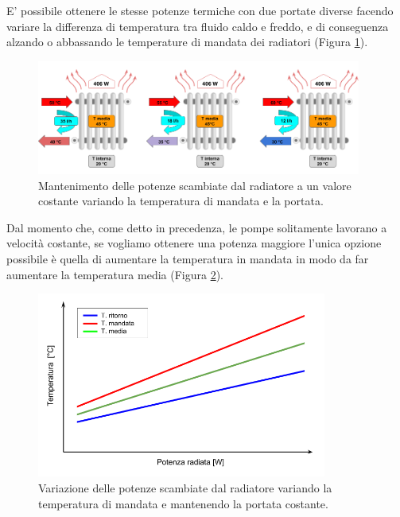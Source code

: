 \documentclass[laurea,oneside,11pt]{USiena_tesiLM}
\begin{document}
E' possibile ottenere  le stesse potenze termiche con due portate diverse facendo variare la differenza di temperatura tra fluido caldo e freddo, e di conseguenza alzando o abbassando le temperature di mandata dei radiatori (Figura \ref{fig:portata}). 

\begin{figure}[h]
\begin{center}
\includegraphics[width=0.95\textwidth]{figure/portata} %
\caption{Mantenimento delle potenze scambiate dal radiatore a un valore costante variando la temperatura di mandata e la portata.}
\label{fig:portata}
\end{center}
\end{figure}

Dal momento che, come detto in precedenza, le pompe solitamente lavorano a velocità costante, se vogliamo ottenere una potenza maggiore l'unica opzione possibile è quella di aumentare la temperatura in mandata in modo da far aumentare la temperatura media (Figura \ref{fig:portata2}).

\begin{figure}[!ht]
\begin{center}
\includegraphics[width=0.85\textwidth]{figure/pot_radiatore} %
\caption{Variazione delle potenze scambiate dal radiatore variando la temperatura di mandata e mantenendo la portata costante.}
\label{fig:portata2}
\end{center}
\end{figure}
\end{document}

